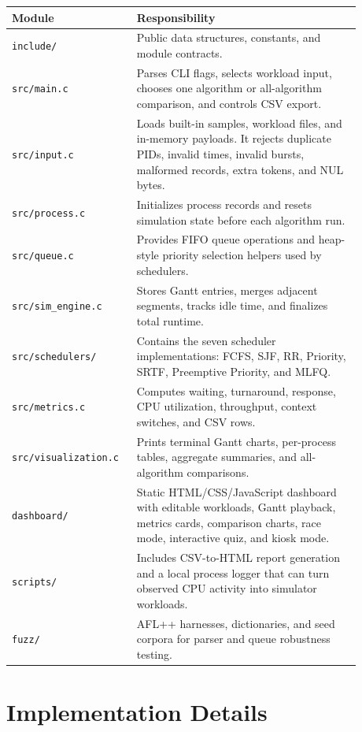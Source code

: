 \documentclass[11pt]{article}
\begin{document}
\begin{longtable}{p{0.28\linewidth}p{0.60\linewidth}}
\toprule
\textbf{Module} & \textbf{Responsibility} \\
\midrule
\texttt{include/} & Public data structures, constants, and module contracts. \\
\texttt{src/main.c} & Parses CLI flags, selects workload input, chooses one
algorithm or all-algorithm comparison, and controls CSV export. \\
\texttt{src/input.c} & Loads built-in samples, workload files, and in-memory
payloads. It rejects duplicate PIDs, invalid times, invalid bursts, malformed
records, extra tokens, and NUL bytes. \\
\texttt{src/process.c} & Initializes process records and resets simulation
state before each algorithm run. \\
\texttt{src/queue.c} & Provides FIFO queue operations and heap-style priority
selection helpers used by schedulers. \\
\texttt{src/sim\_engine.c} & Stores Gantt entries, merges adjacent segments,
tracks idle time, and finalizes total runtime. \\
\texttt{src/schedulers/} & Contains the seven scheduler implementations:
FCFS, SJF, RR, Priority, SRTF, Preemptive Priority, and MLFQ. \\
\texttt{src/metrics.c} & Computes waiting, turnaround, response, CPU
utilization, throughput, context switches, and CSV rows. \\
\texttt{src/visualization.c} & Prints terminal Gantt charts, per-process
tables, aggregate summaries, and all-algorithm comparisons. \\
\texttt{dashboard/} & Static HTML/CSS/JavaScript dashboard with editable
workloads, Gantt playback, metrics cards, comparison charts, race mode,
interactive quiz, and kiosk mode. \\
\texttt{scripts/} & Includes CSV-to-HTML report generation and a local process
logger that can turn observed CPU activity into simulator workloads. \\
\texttt{fuzz/} & AFL++ harnesses, dictionaries, and seed corpora for parser and
queue robustness testing. \\
\bottomrule
\end{longtable}

\section{Implementation Details}
\end{document}
